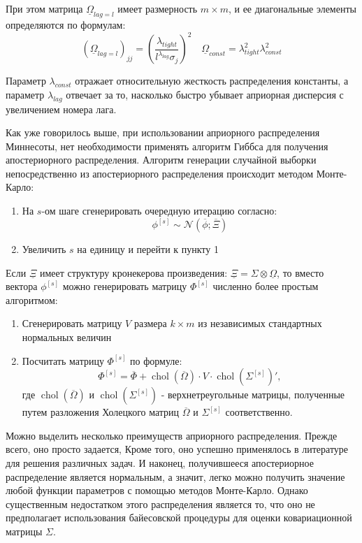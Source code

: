 \documentclass[11pt]{article} %
\DeclareMathOperator{\chol}{chol}
\newcommand{\cN}{\mathcal{N}}
\newcommand{\prior}{\underline}
\newcommand{\post}{\overline}
\begin{document}
При этом матрица $\prior \Omega_{lag=l}$ имеет размерность $m\times m$, и ее диагональные элементы определяются по формулам:
\begin{equation}
(\prior \Omega_{lag=l})_{jj} \label{prior_omega2}
=\left(\frac{\lambda_{tight}}{l^{\lambda_{lag}}\sigma_j}\right)^2
\quad
\prior \Omega_{const}=\lambda_{tight}^2\lambda_{const}^2
\end{equation}

Параметр $\lambda_{const}$ отражает относительную жесткость распределения константы, а параметр $\lambda_{lag}$ отвечает за то, насколько быстро убывает априорная дисперсия с увеличением номера лага.

Как уже говорилось выше, при использовании априорного распределения Миннесоты, нет необходимости применять алгоритм Гиббса для получения апостериорного распределения. Алгоритм генерации случайной выборки непосредственно из апостериорного распределения происходит методом Монте-Карло: \label{alg:alg1}
\begin{enumerate}
\item На $s$-ом шаге сгенерировать очередную итерацию согласно:
\begin{equation}
\phi^{[s]}\sim \cN(\post \phi; \post \Xi)
\end{equation}
\item Увеличить $s$ на единицу и перейти к пункту 1
\end{enumerate}

Если $\prior \Xi$ имеет структуру кронекерова произведения: $\prior \Xi = \Sigma \otimes \prior \Omega$, то вместо вектора $\phi^{[s]}$ можно генерировать матрицу $\Phi^{[s]}$ численно более простым алгоритмом:


\begin{enumerate}
\item Сгенерировать матрицу $V$ размера $k\times m$  из независимых стандартных нормальных величин
\item Посчитать матрицу $\Phi^{[s]}$ по формуле:
\begin{equation}
\Phi^{[s]} = \post \Phi + \chol(\post\Omega) \cdot V \cdot \chol(\Sigma^{[s]})',
\end{equation}
где $\chol(\post\Omega)$ и  $\chol(\Sigma^{[s]})$ - верхнетреугольные матрицы, полученные путем разложения Холецкого матриц $\post\Omega$ и $\Sigma^{[s]}$ соответственно.
\end{enumerate}

Можно выделить несколько преимуществ априорного распределения. Прежде всего, оно просто задается, Кроме того, оно успешно применялось в литературе для решения различных задач. И наконец, получившееся апостериорное распределение является нормальным, а значит, легко можно получить значение любой функции параметров с помощью методов Монте-Карло. Однако существенным недостатком этого распределения является то, что оно не предполагает использования байесовской процедуры для оценки ковариационной матрицы $\Sigma$.
\end{document}
